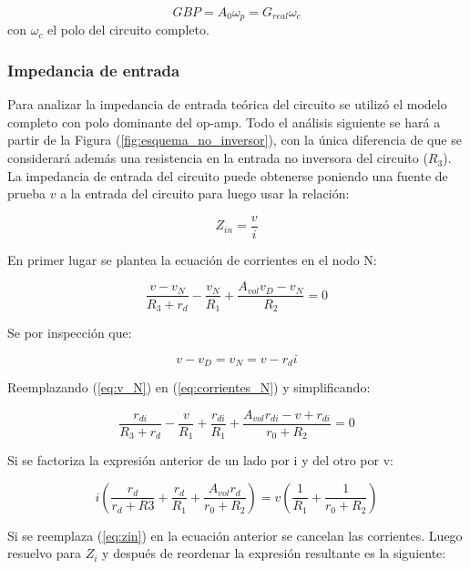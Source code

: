 \begin{equation}\label{eq:GBP}
GBP = A_0\omega_p = G_{real}\omega_c
\end{equation}
con $\omega_c$ el polo del circuito completo.


\subsubsection{Impedancia de entrada}

Para analizar la impedancia de entrada teórica del circuito se utilizó el modelo completo con polo dominante del op-amp. Todo el análisis siguiente se hará a partir de la Figura (\ref{fig:esquema_no_inversor}), con la única diferencia de que se considerará además una resistencia en la entrada no inversora del circuito ($R_3$). La impedancia de entrada del circuito puede obtenerse poniendo una fuente de prueba $v$ a la entrada del circuito para luego usar la relación:

\begin{equation}\label{eq:zin}
Z_{in} = \frac{v}{i}
\end{equation}

En primer lugar se plantea la ecuación de corrientes en el nodo N:

\begin{equation}\label{eq:corrientes_N}
\frac{v - v_N}{R_3 + r_d} - \frac{v_N}{R_1} + \frac{A_{vol}v_D - v_N}{R_2} = 0
\end{equation}

Se por inspección que:

\begin{equation}\label{eq:v_N}
v - v_D = v_N = v - r_di
\end{equation}

Reemplazando (\ref{eq:v_N}) en (\ref{eq:corrientes_N}) y simplificando:

\begin{equation}
\frac{r_{di}}{R_3 + r_d} - \frac{v}{R_1} + \frac{r_{di}}{R_1} +\frac{A_{vol}r_{di} - v + r_{di}}{r_0 + R_2} = 0
\end{equation}

Si se factoriza la expresión anterior de un lado por i y del otro por v:

\begin{equation}
i \left(\frac{r_d}{r_d + R3} + \frac{r_d}{R_1} + \frac{A_{vol}r_d}{r_0 + R_2}\right) = v\left(\frac{1}{R_1} + \frac{1}{r_0 + R_2}\right)
\end{equation}

Si se reemplaza (\ref{eq:zin}) en la ecuación anterior se cancelan las corrientes. Luego resuelvo para $Z_i$ y después de reordenar la expresión resultante es la siguiente:

